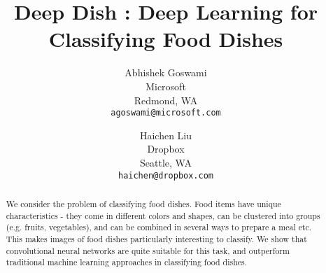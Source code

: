 \documentclass[10pt,twocolumn,letterpaper]{article}
\begin{document}
\title{Deep Dish : Deep Learning for Classifying Food Dishes}

\author{Abhishek Goswami\\
Microsoft\\
Redmond, WA\\
{\tt\small agoswami@microsoft.com}
\and
Haichen Liu\\
Dropbox\\
Seattle, WA\\
{\tt\small haichen@dropbox.com}
}

\maketitle

\begin{abstract}
	
	We consider the problem of classifying food dishes. Food items have unique characteristics - they come in different colors and shapes, can be clustered into groups (e.g. fruits, vegetables), and can be combined in several ways to prepare a meal etc. This makes images of food dishes particularly interesting to classify. We show that convolutional neural networks are quite suitable for this task, and outperform traditional machine learning approaches in classifying food dishes.
		
\end{abstract}








{\small


}
\end{document}
